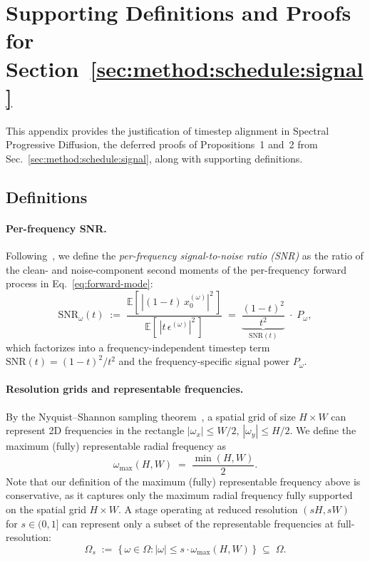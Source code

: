 \makeatletter
\let\addcontentsline\arxiv@savedaddcontentsline
\makeatother

\newpage
\setcounter{tocdepth}{2}
\renewcommand{\contentsname}{Appendix Contents}
\tableofcontents
\newpage
\appendix

\section{Supporting Definitions and Proofs for Section~\ref{sec:method:schedule:signal}}
\label{app:proofs-schedule}

This appendix provides the justification of timestep alignment in Spectral Progressive Diffusion, the deferred proofs of Propositions~1 and~2 from Sec.~\ref{sec:method:schedule:signal}, along with supporting definitions.

\subsection{Definitions}
\label{app:prelim-schedule}

\paragraph{Per-frequency SNR.}
Following~\citet{kingma2021vdm}, we define the \emph{per-frequency signal-to-noise ratio (SNR)} as the ratio of the clean- and noise-component second moments of the per-frequency forward process in Eq.~\eqref{eq:forward-mode}:
\begin{equation}
  \mathrm{SNR}_\omega(t)
  \;:=\;
  \frac{\mathbb{E}[\,|(1-t)\,x_0^{(\omega)}|^2\,]}{\mathbb{E}[\,|t\,\epsilon^{(\omega)}|^2\,]}
  \;=\;
  \underbrace{\frac{(1-t)^2}{t^2}}_{\mathrm{SNR}(t)}\;\cdot\;P_\omega,
  \label{eq:snr}
\end{equation}
which factorizes into a frequency-independent timestep term $\mathrm{SNR}(t) = (1-t)^2/t^2$ and the frequency-specific signal power $P_\omega$.

\paragraph{Resolution grids and representable frequencies.}
By the Nyquist--Shannon sampling theorem~\citep{nyquist1928certain,shannon1949communication}, a spatial grid of size $H \times W$ can represent 2D frequencies in the rectangle $|\omega_x| \le W/2$, $|\omega_y| \le H/2$. We define the maximum (fully) representable radial frequency as
\begin{equation}
  \omega_{\max}(H, W) \;=\; \frac{\min(H, W)}{2}.
  \label{eq:nyquist-cap}
\end{equation}
Note that our definition of the maximum (fully) representable frequency above is conservative, as it captures only the maximum radial frequency fully supported on the spatial grid $H \times W$.
A stage operating at reduced resolution $(sH, sW)$ for $s \in (0,1]$ can represent only a subset of the representable frequencies at full-resolution:
\begin{equation}
  \Omega_s \;:=\; \{\,\omega \in \Omega : |\omega| \le s \cdot \omega_{\max}(H, W)\,\} \;\subseteq\; \Omega.
  \label{eq:nyquist-set}
\end{equation}

